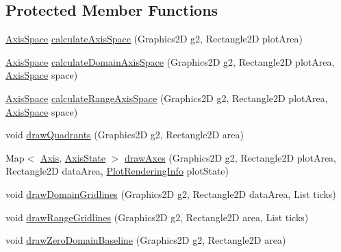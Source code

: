 \subsection*{Protected Member Functions}
\begin{DoxyCompactItemize}
\item 
\mbox{\hyperlink{classorg_1_1jfree_1_1chart_1_1axis_1_1_axis_space}{Axis\+Space}} \mbox{\hyperlink{classorg_1_1jfree_1_1chart_1_1plot_1_1_x_y_plot_af5f4b2b0f930a8b438f40b812c2a130b}{calculate\+Axis\+Space}} (Graphics2D g2, Rectangle2D plot\+Area)
\item 
\mbox{\hyperlink{classorg_1_1jfree_1_1chart_1_1axis_1_1_axis_space}{Axis\+Space}} \mbox{\hyperlink{classorg_1_1jfree_1_1chart_1_1plot_1_1_x_y_plot_ac74b657ad1a6cc1186b09f4d1657984e}{calculate\+Domain\+Axis\+Space}} (Graphics2D g2, Rectangle2D plot\+Area, \mbox{\hyperlink{classorg_1_1jfree_1_1chart_1_1axis_1_1_axis_space}{Axis\+Space}} space)
\item 
\mbox{\hyperlink{classorg_1_1jfree_1_1chart_1_1axis_1_1_axis_space}{Axis\+Space}} \mbox{\hyperlink{classorg_1_1jfree_1_1chart_1_1plot_1_1_x_y_plot_a6dc402789f95dd1f73194e5591092e6e}{calculate\+Range\+Axis\+Space}} (Graphics2D g2, Rectangle2D plot\+Area, \mbox{\hyperlink{classorg_1_1jfree_1_1chart_1_1axis_1_1_axis_space}{Axis\+Space}} space)
\item 
void \mbox{\hyperlink{classorg_1_1jfree_1_1chart_1_1plot_1_1_x_y_plot_a330dca9ee5cb33c2f933197f0b8849e1}{draw\+Quadrants}} (Graphics2D g2, Rectangle2D area)
\item 
Map$<$ \mbox{\hyperlink{classorg_1_1jfree_1_1chart_1_1axis_1_1_axis}{Axis}}, \mbox{\hyperlink{classorg_1_1jfree_1_1chart_1_1axis_1_1_axis_state}{Axis\+State}} $>$ \mbox{\hyperlink{classorg_1_1jfree_1_1chart_1_1plot_1_1_x_y_plot_a9794597e511660dabdb24c6e79781963}{draw\+Axes}} (Graphics2D g2, Rectangle2D plot\+Area, Rectangle2D data\+Area, \mbox{\hyperlink{classorg_1_1jfree_1_1chart_1_1plot_1_1_plot_rendering_info}{Plot\+Rendering\+Info}} plot\+State)
\item 
void \mbox{\hyperlink{classorg_1_1jfree_1_1chart_1_1plot_1_1_x_y_plot_aa6343c458bf492ae7dff6add83f9bfc9}{draw\+Domain\+Gridlines}} (Graphics2D g2, Rectangle2D data\+Area, List ticks)
\item 
void \mbox{\hyperlink{classorg_1_1jfree_1_1chart_1_1plot_1_1_x_y_plot_a3d116d9485f14f97500d262ee4dfc30a}{draw\+Range\+Gridlines}} (Graphics2D g2, Rectangle2D area, List ticks)
\item 
void \mbox{\hyperlink{classorg_1_1jfree_1_1chart_1_1plot_1_1_x_y_plot_ab442f1618c6222af50384b9ffe4257ac}{draw\+Zero\+Domain\+Baseline}} (Graphics2D g2, Rectangle2D area)

\end{DoxyCompactItemize}
